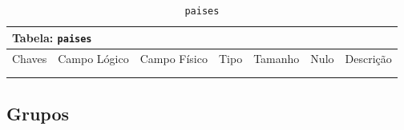 \documentclass[12pt,a4paper]{article}
\begin{document}
\begin{center}
\begin{table}[h!]
	\caption{\texttt{paises}}
	\label{tabela:paises}
	\begin{tabular}{|p{1cm}|p{1.5cm}|p{1.25cm}|p{1.25cm}|p{1.75cm}|p{1.25cm}|p{4.5cm}|}\hline	
		\multicolumn{7}{|p{16cm}|}{\cellcolor{cinzaClaro}  \centering Tabela: \texttt{paises}} \\ \hline %
		{\small Chaves} & {\small Campo Lógico} & {\small Campo Físico} & {\small Tipo} & {\small Tamanho} & {\small Nulo} & {\small Descrição}\\\hline %
		
		{\tiny } & {\tiny } & {\tiny } & {\tiny } & {\tiny } & {\tiny } &{\tiny }\\\hline
		{\tiny } & {\tiny } & {\tiny } & {\tiny } & {\tiny } & {\tiny } &{\tiny }\\\hline
		
			
	\end{tabular}
\end{table}	
\end{center}

\subsection{Grupos}

\end{document}
